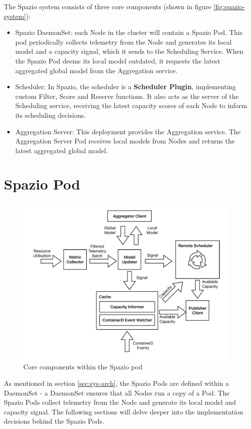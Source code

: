 The Spazio system consists of three core components (shown in figure
\ref{fig:spazio-system}):
\begin{itemize}
    \item Spazio DaemonSet: each Node in the cluster will contain a Spazio Pod.
        This pod periodically collects telemetry from the Node and generates its
        local model and a capacity signal, which it sends to the Scheduling
        Service. When the Spazio Pod deems its local model outdated, it requests
        the latest aggregated global model from the Aggregation service.
    \item Scheduler: In Spazio, the scheduler is a \textbf{Scheduler Plugin},
        implementing custom Filter, Score and Reserve functions. It also acts as
        the server of the Scheduling service, receiving the latest capacity
        scores of each Node to inform its scheduling decisions.
    \item Aggregation Server: This deployment provides the Aggregation service.
        The Aggregation Server Pod receives local models from Nodes
        and returns the latest aggregated global model.
\end{itemize}

\section{Spazio Pod}
\begin{figure}[H]
    \centering
    \includegraphics[width=\textwidth]{images/spazio-pod.pdf}
    \caption{Core components within the Spazio pod}
    \label{spazio-pod-components}
\end{figure}
As mentioned in section \ref{sec:sys-arch}, the Spazio Pods are defined within a
DaemonSet - a DaemonSet ensures that all Nodes run a copy of a Pod. The Spazio
Pods collect telemetry from the Node and generate its local model and capacity
signal. The following sections will delve deeper into the implementation
decisions behind the Spazio Pods.

